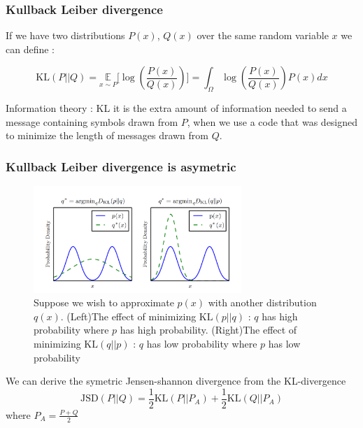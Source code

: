\documentclass[french,9pt]{beamer}
\begin{document}
\begin{frame}
\frametitle{Kullback Leiber divergence}

If we have two distributions $P(x)$, $Q(x)$ over the same random variable $x$ we can define :

\begin{equation}
\label{kldiv}
\text{KL}(P||Q)=\underset{x \sim P}{\mathbb{E}}\big[\log(\frac{P(x)}{Q(x)})\big]=\int_{\Omega} \log(\frac{P(x)}{Q(x)}) P(x) dx
\end{equation}

Information theory : KL it is the extra amount of information needed to send a message containing symbols drawn from $P$, when we use a code that was designed to minimize the length of messages drawn from $Q$.

\end{frame}

\begin{frame}
\frametitle{Kullback Leiber divergence is asymetric}

\begin{figure}
  \begin{center}
    \includegraphics[width=0.7\textwidth]{fig/asymkl.png}
  \end{center}
  \caption{{\small Suppose we wish to approximate $p(x)$ with another distribution $q(x)$. (Left)The effect of minimizing $\text{KL}(p||q)$ : $q$ has high probability where $p$ has high probability. (Right)The effect of minimizing $\text{KL}(q||p)$ : $q$ has low probability where $p$ has low probability \cite{DBLP:journals/nature/LeCunBH15}}}
\end{figure}

We can derive the symetric Jensen-shannon divergence from the KL-divergence 
\begin{equation}
\label{kldiv}
\text{JSD}(P||Q)=\frac{1}{2} \text{KL}(P||P_{A}) + \frac{1}{2} \text{KL}(Q||P_{A})
\end{equation}
where $P_{A}=\frac{P+Q}{2}$
 
\end{frame}
\end{document}
